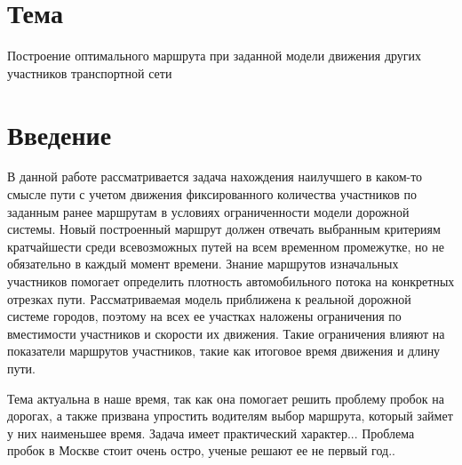 \documentclass[12pt, a4paper]{article}
\begin{document}
 \section*{Тема}
Построение оптимального маршрута при заданной модели движения других участников транспортной сети


\section{Введение}

В данной работе рассматривается задача нахождения наилучшего в каком-то смысле пути с учетом движения фиксированного количества участников по заданным ранее маршрутам в условиях ограниченности модели дорожной системы. Новый построенный маршрут должен отвечать выбранным критериям кратчайшести среди всевозможных путей на всем временном промежутке, но не обязательно в каждый момент времени. Знание маршрутов изначальных участников помогает определить плотность автомобильного потока на конкретных отрезках пути. Рассматриваемая модель приближена к реальной дорожной системе городов, поэтому на всех ее участках наложены ограничения по вместимости участников и скорости их движения. Такие ограничения влияют на показатели маршрутов участников, такие как итоговое время движения и длину пути. 


Тема актуальна в наше время, так как она помогает решить проблему пробок на дорогах, а также призвана упростить водителям выбор маршрута, который займет у них наименьшее время. Задача имеет практический характер... Проблема пробок в Москве стоит очень остро, ученые решают ее не первый год..
\end{document}
